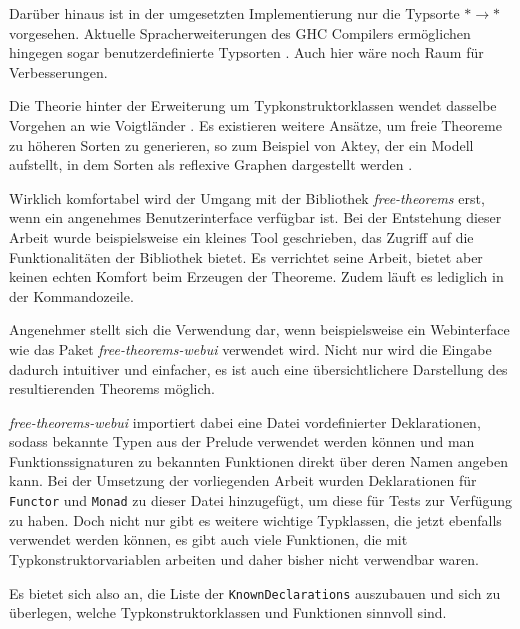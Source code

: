 
Darüber hinaus ist in der umgesetzten Implementierung nur die Typsorte $* \rightarrow *$ vorgesehen.
Aktuelle Spracherweiterungen des
GHC Compilers ermöglichen hingegen sogar benutzerdefinierte Typsorten \cite{yorgey}. Auch
hier wäre noch Raum für Verbesserungen.

Die Theorie hinter der Erweiterung um Typkonstruktorklassen wendet dasselbe Vorgehen an wie
Voigtländer \cite{voigtlander}. Es existieren weitere Ansätze, um freie Theoreme zu höheren Sorten
zu generieren, so zum Beispiel von Aktey, der ein Modell aufstellt, in dem Sorten als reflexive
Graphen dargestellt werden \cite{atkey}.

Wirklich komfortabel wird der Umgang mit der Bibliothek \textit{free-theorems} erst, wenn ein angenehmes Benutzerinterface verfügbar ist.
Bei der Entstehung dieser Arbeit wurde beispielsweise ein kleines Tool geschrieben, das Zugriff auf die Funktionalitäten
der Bibliothek bietet. Es verrichtet seine Arbeit, bietet aber keinen echten Komfort beim Erzeugen der Theoreme. Zudem
läuft es lediglich in der Kommandozeile.

Angenehmer stellt sich die Verwendung dar, wenn beispielsweise ein Webinterface wie das Paket \textit{free-theorems-webui}
\cite{freetheoremswebui} verwendet wird. Nicht nur wird die Eingabe dadurch intuitiver und einfacher, es ist auch eine
übersichtlichere Darstellung des resultierenden Theorems möglich.

\textit{free-theorems-webui} importiert dabei eine Datei vordefinierter Deklarationen, sodass bekannte Typen aus der
Prelude verwendet werden können und man Funktionssignaturen zu bekannten Funktionen direkt über deren Namen
angeben kann. Bei der Umsetzung der vorliegenden Arbeit wurden Deklarationen für \texttt{Functor} und \texttt{Monad}
zu dieser Datei hinzugefügt, um diese für Tests zur Verfügung zu haben.
Doch nicht nur gibt es weitere wichtige Typklassen, die jetzt ebenfalls verwendet werden können, es gibt
auch viele Funktionen, die mit Typkonstruktorvariablen arbeiten und daher bisher nicht verwendbar waren.

Es bietet sich also an, die Liste der \texttt{KnownDeclarations} auszubauen und sich zu überlegen, welche
Typkonstruktorklassen und Funktionen sinnvoll sind.